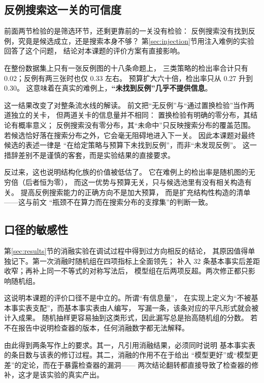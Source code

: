 \subsection{反例搜索这一关的可信度}
\label{sec:eval-injection}

前面两节检验的是筛选环节，还剩更靠前的一关没有检验：
反例搜索没有找到反例，究竟是候选成立，还是搜索本身不够？
第\ref{sec:injection}节用注入难例的实验回答了这个问题，
结论对本课题的评价方案有直接影响。

在整份数据集上只有一张反例图的十八条命题上，
三类策略的检出率合计只有 0.02；反例有两三张时也仅 0.33 左右。
预算扩大六十倍，检出率只从 0.27 升到 0.30。
这意味着在真实的难例上，\textbf{“未找到反例”几乎不提供信息}。

这一结果改变了对整条流水线的解读。
前文把“无反例”与“通过置换检验”当作两道独立的关卡，
但两道关卡的信息量并不相同：
置换检验有明确的零分布，其结论有概率意义；
反例搜索没有零分布，其“未命中”只反映搜索分布的覆盖范围。
若候选恰好落在搜索分布之外，它会毫无阻碍地进入下一关。
因此本课题对最终候选的表述一律是
“在给定策略与预算下未找到反例”，而非“未发现反例”。
这一措辞差别不是谨慎的客套，而是实验结果的直接要求。

反过来，这也说明结构化族的价值被低估了。
它在难例上的检出率是随机图的无穷倍（后者恒为零），
而这一优势与预算无关，只与候选池里有没有相关构造有关。
提高反例搜索能力的正确方向不是加大预算，
而是扩充结构性构造的清单——这与前文
“瓶颈不在算力而在搜索分布的支撑集”的判断一致。

\subsection{口径的敏感性}

第\ref{sec:results}节的消融实验在调试过程中得到过方向相反的结论，
其原因值得单独记下。第一次消融时随机组在四项指标上全面领先；
补入 32 条基本事实后差距收窄；再补上同一不等式的对称写法后，
模型组在后两项反超。两次修正都只影响随机组。

这说明本课题的评价口径不是中立的。所谓“有信息量”，
在实现上定义为“不被基本事实表支配”，而基本事实表由人编写，
写漏一条，该条对应的平凡形式就会被计入成果。
随机抽样更容易抽到这类形式，因此漏写总是抬高随机组的分数。
若不在报告中说明检查器的版本，任何消融数字都无法解释。

由此得到两条写作上的要求。其一，凡引用消融结果，必须同时说明
基本事实表的条目数与该表的修订过程。其二，消融的作用不在于给出
“模型更好”或“模型更差”的定论，而在于暴露检查器的漏洞——
两次结论翻转都直接导致了检查器的修补，这才是该实验的真实产出。

